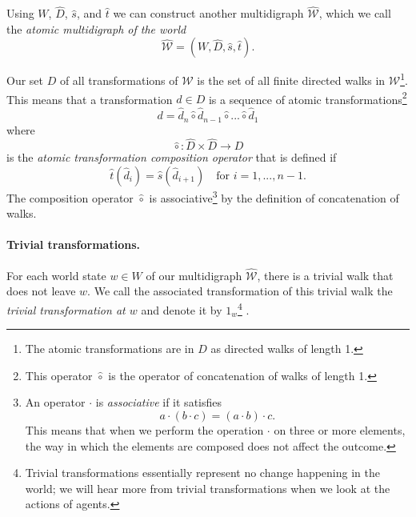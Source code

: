 Using $W$, $\hat{D}$, $\hat{s}$, and $\hat{t}$ we can construct another multidigraph $\hat{\mathscr{W}}$, which we call the \emph{atomic multidigraph of the world}
\begin{equation}
	\hat{\mathscr{W}} = (W, \hat{D}, \hat{s}, \hat{t}).
\end{equation}

Our set $D$ of all transformations of $\mathscr{W}$ is the set of all finite directed walks in $\mathscr{W}$\footnote{
	The atomic transformations are in $D$ as directed walks of length 1.
}.
This means that a transformation $d \in D$ is a sequence of atomic transformations\footnote{
	This operator $\hat{\circ}$ is the operator of concatenation of walks of length 1.
	}
\begin{equation}
	d = \hat{d}_{n} \hat{\circ} \hat{d}_{n-1} \hat{\circ} ... \hat{\circ} \hat{d}_{1}
\end{equation}
where
\begin{equation}
	\hat{\circ}: \hat{D} \times \hat{D} \to D
\end{equation}
is the \emph{atomic transformation composition operator} that is defined if
\begin{equation}
	\hat{t}(\hat{d}_{i}) = \hat{s}(\hat{d}_{i+1}) \quad \text{for $i = 1, ..., n-1$}.
\end{equation}
The composition operator $\hat{\circ}$ is associative\footnote{
An operator $\cdot$ is \emph{associative} if it satisfies
\begin{equation}
	a \cdot (b \cdot c) = (a \cdot b) \cdot c.
\end{equation}
This means that when we perform the operation $\cdot$ on three or more elements, the way in which the elements are composed does not affect the outcome.
}
by the definition of concatenation of walks.


\paragraph{Trivial transformations.}
For each world state $w \in W$ of our multidigraph $\hat{\mathscr{W}}$, there is a trivial walk that does not leave $w$.
We call the associated transformation of this trivial walk the \emph{trivial transformation at $w$} and denote it by $1_{w}$\footnote{Trivial transformations essentially represent no change happening in the world; we will hear more from trivial transformations when we look at the actions of agents.}
.

